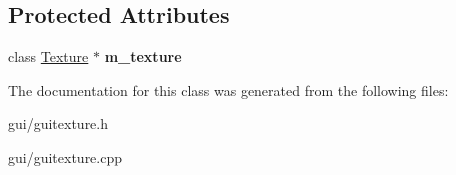 \subsection*{Protected Attributes}
\begin{DoxyCompactItemize}
\item 
class \hyperlink{classTexture}{Texture} $\ast$ {\bfseries m\+\_\+texture}\hypertarget{classGuiTexture_a7ca8c35d3d50d1a9d319dda1cb03f872}{}\label{classGuiTexture_a7ca8c35d3d50d1a9d319dda1cb03f872}

\end{DoxyCompactItemize}


The documentation for this class was generated from the following files\+:\begin{DoxyCompactItemize}
\item 
gui/guitexture.\+h\item 
gui/guitexture.\+cpp\end{DoxyCompactItemize}

